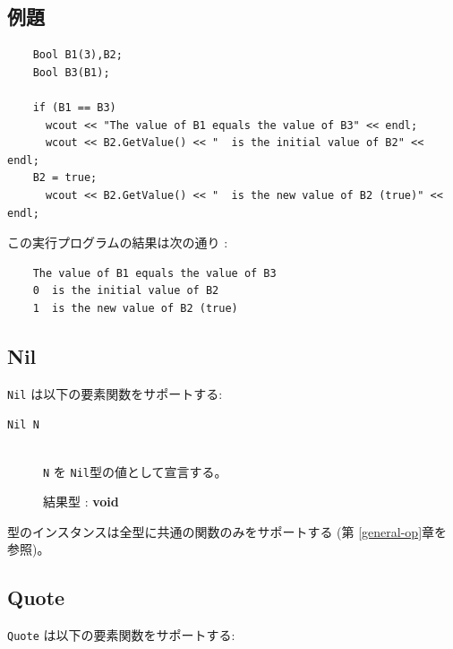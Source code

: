 \documentclass[\pformat,12pt]{jarticle}
\begin{document}
\subsection*{例題}

\begin{verbatim}
    Bool B1(3),B2;
    Bool B3(B1);

    if (B1 == B3)
      wcout << "The value of B1 equals the value of B3" << endl;
      wcout << B2.GetValue() << "  is the initial value of B2" << endl;
    B2 = true;
      wcout << B2.GetValue() << "  is the new value of B2 (true)" << endl;
\end{verbatim}

\noindent この実行プログラムの結果は次の通り :

\begin{verbatim}
    The value of B1 equals the value of B3
    0  is the initial value of B2
    1  is the new value of B2 (true)
\end{verbatim}


\subsection{Nil}
{\tt Nil} は以下の要素関数をサポートする:

\vspace{0.5cm}

\begin{description}
\item[{\tt Nil N}] \mbox{}\\
     {\tt N} を {\tt Nil}型の値として宣言する。

     結果型 : {\bf void}

\end{description}

 型のインスタンスは全型に共通の関数のみをサポートする (第 \ref{general-op}章を参照)。


\subsection{Quote}
{\tt Quote} は以下の要素関数をサポートする:

\vspace{0.5cm}
\end{document}
